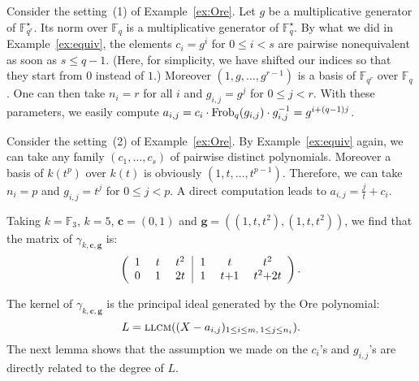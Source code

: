 \documentclass[a4paper]{llncs}
\newcommand{\FF}{\mathbb F}
\newcommand{\Frob}{\textrm{\rm Frob}}
\newcommand{\llcm}{\textsc{llcm}}
\newcommand{\bc}{\textbf{c}}
\newcommand{\bg}{\textbf{g}}
\begin{document}
{\small
\begin{example}
\label{ex:aij1}
Consider the setting~(1) of Example~\ref{ex:Ore}. Let $g$ be a 
multiplicative generator of $\FF_{q^r}^\star$. Its norm over $\FF_q$ is 
a multiplicative generator of $\FF_q^\star$. By what we did in 
Example~\ref{ex:equiv}, the elements $c_i = g^i$ for $0 \leq i < s$ 
are pairwise nonequivalent as soon as $s \leq q-1$. (Here, for
simplicity, we have shifted our indices so that they start from $0$
instead of $1$.)
Moreover $(1, g, \ldots, g^{r-1})$ is a 
basis of $\FF_{q^r}$ over $\FF_q$. One can then take $n_i = r$ for all 
$i$ and $g_{i,j} = g^j$ for $0 \leq j < r$. With these parameters, we 
easily compute $a_{i,j} = c_i \cdot \Frob_q(g_{i,j}) \cdot g_{i,j}^{-1} 
= g^{i + (q-1)j}$.
\end{example}

\begin{example}
\label{ex:aij2}
Consider the setting~(2) of Example~\ref{ex:Ore}.
By Example~\ref{ex:equiv} again, we can take any family $(c_1, \ldots, 
c_s)$ of pairwise distinct polynomials. Moreover a basis of $k(t^p)$ 
over $k(t)$ is obviously $(1, t, \ldots, t^{p-1})$. Therefore, we can 
take $n_i = p$ and $g_{i,j} = t^j$ for $0 \leq j < p$. A direct 
computation leads to $a_{i,j} = \frac j t + c_i$. 

\noindent
Taking $k = \FF_3$, $k = 5$, $\bc = (0,1)$ and $\bg = 
((1,t,t^2),(1,t,t^2))$, we find that the matrix of
$\gamma_{k,\bc,\bg}$ is:
\begin{equation}
\label{eq:gamma}
\left(\begin{array}{c@{\hspace{3ex}}c@{\hspace{3ex}}c@{\hspace{1.5ex}}|
@{\hspace{1.5ex}}c@{\hspace{3ex}}c@{\hspace{3ex}}c}
1 & t & t^2 &
1 & t & t^2 \\
0 & 1 & 2t &
1 & t{+}1 & t^2{+}2t 
\end{array} \right).
\end{equation}
\end{example}}

The kernel of $\gamma_{k,\bc,\bg}$ is the principal ideal generated
by the Ore polynomial:
\begin{equation}
\label{eq:defL}
L = \llcm((X - a_{i,j})_{1 \leq i \leq m,\,1 \leq j \leq n_i}).
\end{equation}
The next lemma shows that the assumption we made on the $c_i$'s
and $g_{i,j}$'s are directly related to the degree of $L$.
\end{document}
